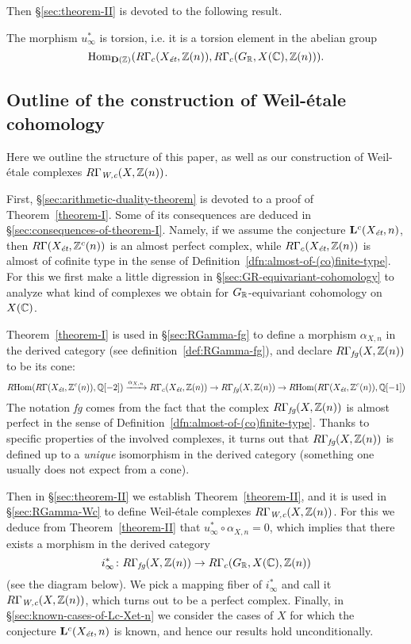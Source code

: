 \documentclass{article}
\numberwithin{equation}{section}
\begin{document}
Then \S\ref{sec:theorem-II} is devoted to the following result.

\begin{maintheorem}
  \label{theorem-II}
  The morphism $u_\infty^*$ is torsion, i.e. it is a torsion element in the
  abelian group
  $$\Hom_{\mathbf{D} (\ZZ)} (R\Gamma_c (X_\et, \ZZ(n)), R\Gamma_c (G_\RR, X (\CC), \ZZ(n))).$$
\end{maintheorem}

\subsection*{Outline of the construction of Weil-étale cohomology}

Here we outline the structure of this paper, as well as our construction of
Weil-étale complexes $R\Gamma_\Wc (X, \ZZ (n))$.

First, \S\ref{sec:arithmetic-duality-theorem} is devoted to a proof of
Theorem~\ref{theorem-I}. Some of its consequences are deduced in
\S\ref{sec:consequences-of-theorem-I}. Namely, if we assume the conjecture
$\mathbf{L}^c (X_\et, n)$, then $R\Gamma (X_\et, \ZZ^c (n))$ is an almost
perfect complex, while $R\Gamma_c (X_\et, \ZZ (n))$ is almost of cofinite type
in the sense of Definition~\ref{dfn:almost-of-(co)finite-type}. For this we
first make a little digression in \S\ref{sec:GR-equivariant-cohomology} to
analyze what kind of complexes we obtain for $G_\RR$-equivariant cohomology on
$X (\CC)$.

Theorem~\ref{theorem-I} is used in \S\ref{sec:RGamma-fg} to define a morphism
$\alpha_{X,n}$ in the derived category (see definition~\ref{def:RGamma-fg}),
and declare $R\Gamma_\fg (X, \ZZ(n))$ to be its cone:
\[ \RHom (R\Gamma (X_\et, \ZZ^c (n)), \QQ [-2]) \xrightarrow{\alpha_{X,n}}
R\Gamma_c (X_\et, \ZZ (n)) \to
R\Gamma_\fg (X, \ZZ(n)) \to
\RHom (R\Gamma (X_\et, \ZZ^c (n)), \QQ [-1]) \]
The notation \emph{fg} comes from the fact that the complex
$R\Gamma_\fg (X, \ZZ(n))$ is almost perfect in the sense of
Definition~\ref{dfn:almost-of-(co)finite-type}. Thanks to specific properties
of the involved complexes, it turns out that $R\Gamma_\fg (X, \ZZ(n))$ is
defined up to a \emph{unique} isomorphism in the derived category (something one
usually does not expect from a cone).

Then in \S\ref{sec:theorem-II} we establish Theorem~\ref{theorem-II}, and it is
used in \S\ref{sec:RGamma-Wc} to define Weil-étale complexes
$R\Gamma_\Wc (X, \ZZ(n))$. For this we deduce from Theorem~\ref{theorem-II} that
$u_\infty^* \circ \alpha_{X,n} = 0$, which implies that there exists a morphism
in the derived category
$$i_\infty^*\colon R\Gamma_\fg (X, \ZZ (n)) \to R\Gamma_c (G_\RR, X (\CC), \ZZ(n))$$
(see the diagram below). We pick a mapping fiber of $i_\infty^*$ and call it
$R\Gamma_\Wc (X, \ZZ (n))$, which turns out to be a perfect complex.
Finally, in \S\ref{sec:known-cases-of-Lc-Xet-n} we consider the cases of $X$ for
which the conjecture $\mathbf{L}^c (X_\et, n)$ is known, and hence our results hold unconditionally.
\end{document}
